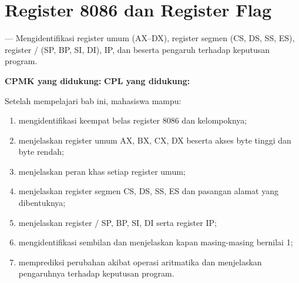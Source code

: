 \documentclass[../../main.tex]{subfiles}
\begin{document}
\chapter{Register 8086 dan Register Flag}
\label{chap:register}


\begin{subcpmkbox}
\vspace{1.1em}
 --- Mengidentifikasi register umum (AX--DX), register
segmen (CS, DS, SS, ES), register / (SP, BP,
SI, DI), IP, dan  beserta pengaruh  terhadap
keputusan program.

\vspace{0.4em}
\textbf{CPMK yang didukung:}  \quad\textbullet\quad
\textbf{CPL yang didukung:} 
\end{subcpmkbox}

\begin{tujuanbox}
\vspace{1.1em}
Setelah mempelajari bab ini, mahasiswa mampu:
\begin{enumerate}
    \item mengidentifikasi keempat belas register 8086 dan
          kelompoknya;
    \item menjelaskan register umum AX, BX, CX, DX beserta akses byte
          tinggi dan byte rendah;
    \item menjelaskan peran khas setiap register umum;
    \item menjelaskan register segmen CS, DS, SS, ES dan pasangan
          alamat yang dibentuknya;
    \item menjelaskan register / SP, BP, SI,
          DI serta register IP;
    \item mengidentifikasi sembilan  dan menjelaskan kapan
          masing-masing bernilai 1;
    \item memprediksi perubahan  akibat operasi aritmatika
          dan menjelaskan pengaruhnya terhadap keputusan program.
\end{enumerate}
\end{tujuanbox}
\end{document}
